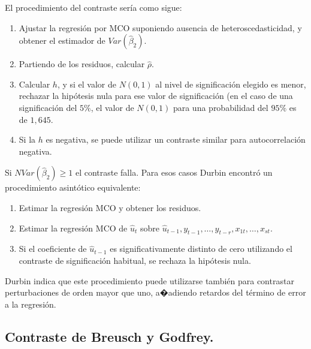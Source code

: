 El procedimiento del contraste ser\'ia como sigue:
\begin{enumerate}
\item Ajustar la regresi\'on por MCO suponiendo ausencia de heteroscedasticidad,
y obtener el estimador de $Var\left(\hat{\beta}_{2}\right)$.
\item Partiendo de los residuos, calcular $\hat{\rho}$.
\item Calcular $h$, y si el valor de $N\left(0,1\right)$ al nivel de significaci\'on
elegido es menor, rechazar la hip\'otesis nula para ese valor de significaci\'on
(en el caso de una significaci\'on del $5\%$, el valor de $N\left(0,1\right)$
para una probabilidad del $95\%$ es de $1,645$.
\item Si la $h$ es negativa, se puede utilizar un contraste similar para
autocorrelaci\'on negativa.
\end{enumerate}
Si $NVar\left(\hat{\beta}_{2}\right)\geq1$ el contraste falla. Para
esos casos Durbin encontr\'o un procedimiento asint\'otico equivalente:
\begin{enumerate}
\item Estimar la regresi\'on MCO y obtener los residuos.
\item Estimar la regresi\'on MCO de $\hat{u}_{t}$ sobre $\hat{u}_{t-1},y_{t-1},\ldots,y_{t-r},x_{1t},\ldots,x_{st}$.
\item Si el coeficiente de $\hat{u}_{t-1}$ es significativamente distinto
de cero utilizando el contraste de significaci\'on habitual, se rechaza
la hip\'otesis nula.
\end{enumerate}
Durbin indica que este procedimiento puede utilizarse tambi\'en para
contrastar perturbaciones de orden mayor que uno, a�adiendo retardos
del t\'ermino de error a la regresi\'on.


\subsection{Contraste de Breusch y Godfrey.}

